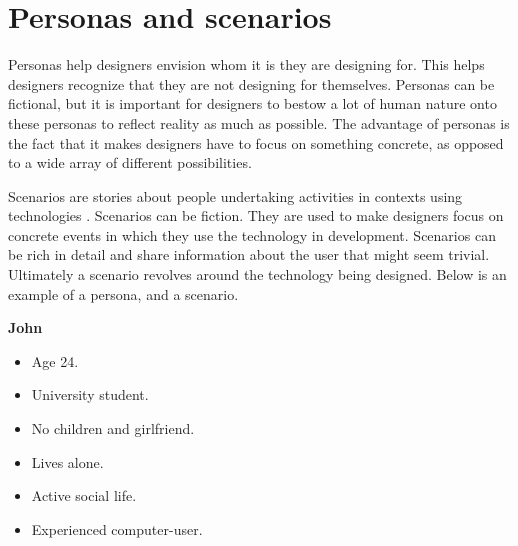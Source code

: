 \section{Personas and scenarios}


Personas help designers envision whom it is they are designing for. This helps designers recognize that they are not designing for themselves. Personas can be fictional, but it is important for designers to bestow a lot of human nature onto these personas to reflect reality as much as possible. The advantage of personas is the fact that it makes designers have to focus on something concrete, as opposed to a wide array of different possibilities\cite{Benyon10}.


Scenarios are stories about people undertaking activities in contexts using technologies \cite{Benyon10}. Scenarios can be fiction. They are used to make designers focus on concrete events in which they use the technology in development. Scenarios can be rich in detail and share information about the user that might seem trivial. Ultimately a scenario revolves around the technology being designed\cite{Benyon10}.
Below is an example of a persona, and a scenario.

\vspace{5 mm}
\noindent

\textbf{John}
\begin{itemize}
	\item Age 24.
	\item University student.
	\item No children and girlfriend.
	\item Lives alone.
	\item Active social life.
	\item Experienced computer-user.
\end{itemize}

